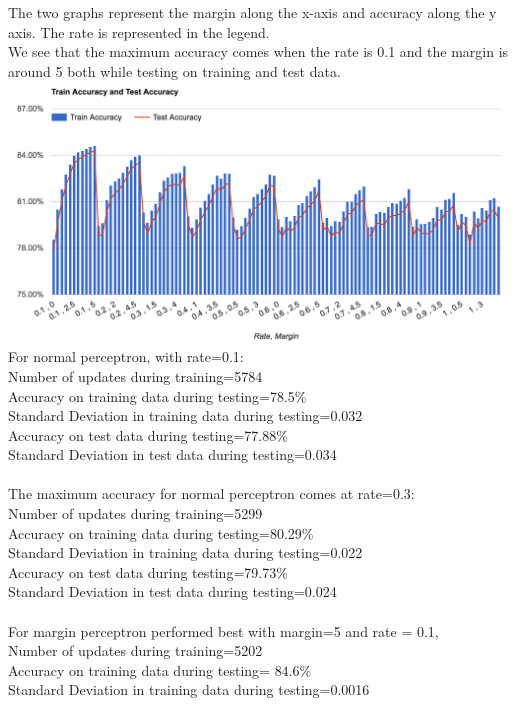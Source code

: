 \documentclass[12pt, fullpage,letterpaper]{article}
\begin{document}
The two graphs represent the margin along the x-axis and accuracy along the y axis. The rate is represented in the legend.\\
We see that the maximum accuracy comes when the rate is 0.1 and the margin is around 5 both while testing on training and test data.\\
\includegraphics[scale=0.5]{332.png}
For normal perceptron, with rate=0.1:\\ 
Number of updates during training=5784\\
Accuracy on training data during testing=78.5\%\\
Standard Deviation in training data during testing=0.032\\
Accuracy on test data during testing=77.88\%\\
Standard Deviation in test data during testing=0.034\\\\
The maximum accuracy for normal perceptron comes at rate=0.3:\\
Number of updates during training=5299\\
Accuracy on training data during testing=80.29\%\\
Standard Deviation in training data during testing=0.022\\
Accuracy on test data during testing=79.73\%\\
Standard Deviation in test data during testing=0.024\\\\
For margin perceptron performed best  with margin=5 and rate = 0.1,\\
Number of updates during training=5202\\
Accuracy on training data during testing= $84.6\%$ \\
Standard Deviation in training data during testing=0.0016\\
\end{document}
